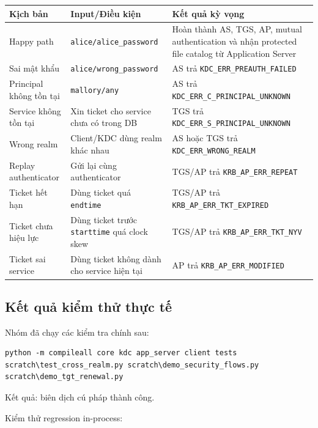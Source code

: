 \documentclass[12pt]{article}
\begin{document}
\begin{table}[H]
\centering
\renewcommand{\arraystretch}{1.3}
\begin{tabularx}{\textwidth}{|p{4cm}|p{5.2cm}|X|}
\hline
\textbf{Kịch bản} & \textbf{Input/Điều kiện} & \textbf{Kết quả kỳ vọng} \\
\hline
Happy path & \texttt{alice/alice\_password} & Hoàn thành AS, TGS, AP, mutual authentication và nhận protected file catalog từ Application Server \\
\hline
Sai mật khẩu & \texttt{alice/wrong\_password} & AS trả \texttt{KDC\_ERR\_PREAUTH\_FAILED} \\
\hline
Principal không tồn tại & \texttt{mallory/any} & AS trả \texttt{KDC\_ERR\_C\_PRINCIPAL\_UNKNOWN} \\
\hline
Service không tồn tại & Xin ticket cho service chưa có trong DB & TGS trả \texttt{KDC\_ERR\_S\_PRINCIPAL\_UNKNOWN} \\
\hline
Wrong realm & Client/KDC dùng realm khác nhau & AS hoặc TGS trả \texttt{KDC\_ERR\_WRONG\_REALM} \\
\hline
Replay authenticator & Gửi lại cùng authenticator & TGS/AP trả \texttt{KRB\_AP\_ERR\_REPEAT} \\
\hline
Ticket hết hạn & Dùng ticket quá \texttt{endtime} & TGS/AP trả \texttt{KRB\_AP\_ERR\_TKT\_EXPIRED} \\
\hline
Ticket chưa hiệu lực & Dùng ticket trước \texttt{starttime} quá clock skew & TGS/AP trả \texttt{KRB\_AP\_ERR\_TKT\_NYV} \\
\hline
Ticket sai service & Dùng ticket không dành cho service hiện tại & AP trả \texttt{KRB\_AP\_ERR\_MODIFIED} \\
\hline
\end{tabularx}
\end{table}

\subsection{Kết quả kiểm thử thực tế}

Nhóm đã chạy các kiểm tra chính sau:

\begin{lstlisting}[style=textcode]
python -m compileall core kdc app_server client tests scratch\test_cross_realm.py scratch\demo_security_flows.py scratch\demo_tgt_renewal.py
\end{lstlisting}

Kết quả: biên dịch cú pháp thành công.

Kiểm thử regression in-process:
\end{document}
